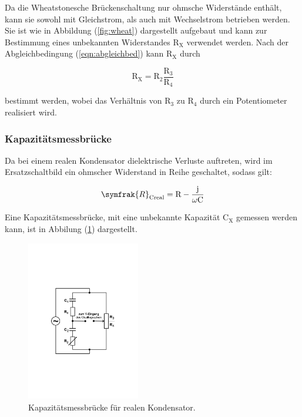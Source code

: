 \noindent
Da die Wheatstonesche Brückenschaltung nur ohmsche Widerstände enthält, kann sie sowohl mit Gleichstrom, 
als auch mit Wechselstrom betrieben werden.
Sie ist wie in Abbildung (\ref{fig:wheat}) dargestellt aufgebaut und kann zur Bestimmung eines unbekannten Widerstandes $\text{R}_\text{X}$ verwendet werden.
Nach der Abgleichbedingung (\ref{eqn:abgleichbed}) kann $\text{R}_\text{X}$ durch

\begin{equation}
\text{R}_\text{X} = \text{R}_2 \frac{\text{R}_3}{\text{R}_4}
\end{equation}

\noindent
bestimmt werden, wobei das Verhältnis von $\text{R}_3$ zu $\text{R}_4$ durch ein Potentiometer realisiert wird.

\subsubsection{Kapazitätsmessbrücke}
Da bei einem realen Kondensator dielektrische Verluste auftreten, wird im Ersatzschaltbild ein ohmscher Widerstand in Reihe geschaltet, sodass gilt:

\begin{equation}
\symfrak{R}_\text{Creal}= \text{R}-\frac{\text{j}}{\omega \text{C}}
\label{eqn:r_creal}
\end{equation}

\noindent
Eine Kapazitätsmessbrücke, mit eine unbekannte Kapazität $\text{C}_\text{X}$ gemessen werden kann, ist in Abbilung (\ref{fig:kap}) dargestellt.

\newpage
\begin{figure}
            \centering
               \includegraphics[height=7cm]{kapazitaet.pdf}
               \caption{Kapazitätsmessbrücke für realen Kondensator.}
               \label{fig:kap}
        \end{figure}

